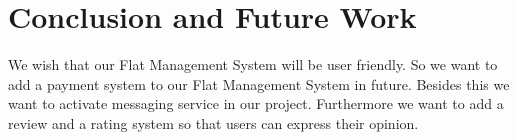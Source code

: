 \section{Conclusion and Future Work}\label{sec:cfw}
We wish that our Flat Management System will be user friendly. So we want to add a payment system to our Flat Management System in future. Besides this we want to activate messaging service in our project. Furthermore we want to add a review and a rating system so that users can express their opinion.
\clearpage
